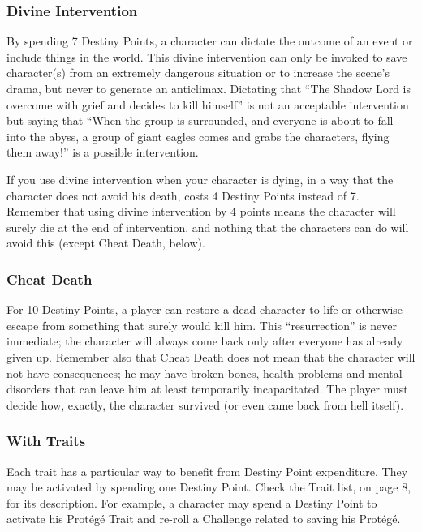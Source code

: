 \begin{multicols}{2}
\subsubsection{Divine Intervention}
By spending 7 Destiny Points, a character can dictate the outcome of an event or include things in the world. This divine intervention can only be invoked to save character(s) from an extremely dangerous situation or to increase the scene’s drama, but never to generate an anticlimax. Dictating that ``The Shadow Lord is overcome with grief and decides to kill himself'' is not an acceptable intervention but saying that ``When the group is surrounded, and everyone is about to fall into the abyss, a group of giant eagles comes and grabs the characters, flying them away!'' is a possible intervention.

If you use divine intervention when your character is dying, in a way that the character does not avoid his death, costs 4 Destiny Points instead of 7. Remember that using divine intervention by 4 points means the character will surely die at the end of intervention, and nothing that the characters can do will avoid this (except Cheat Death, below).

\subsubsection{Cheat Death}
For 10 Destiny Points, a player can restore a dead character to life or otherwise escape from something that surely would kill him. This ``resurrection'' is never immediate; the character will always come back only after everyone has already given up. Remember also that Cheat Death does not mean that the character will not have consequences; he may have broken bones, health problems and mental disorders that can leave him at least temporarily incapacitated. The player must decide how, exactly, the character survived (or even came back from hell itself).

\subsubsection{With Traits}
Each trait has a particular way to benefit from Destiny Point expenditure. They may be activated by spending one Destiny Point. Check the Trait list, on page 8, for its description. For example, a character may spend a Destiny Point to activate his Protégé Trait and re-roll a Challenge related to saving his Prot\'eg\'e. 


\end{multicols}
